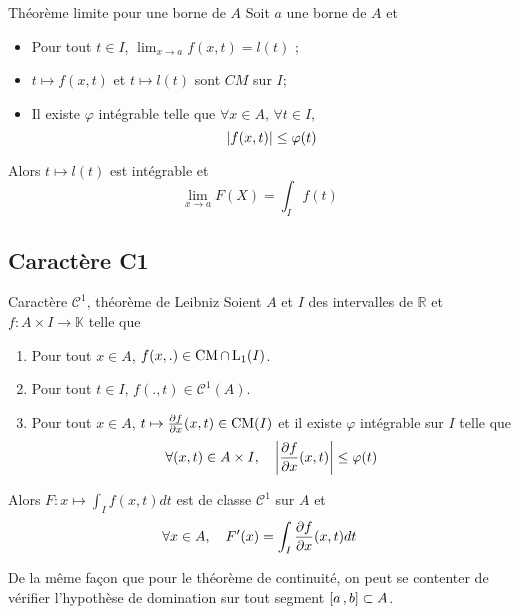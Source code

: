     \begin{prop}{Théorème limite pour une borne de $A$}{}
        Soit $a$ une borne de $A$ et 
        \begin{itemize}
            \item Pour tout $t \in I$, $\lim_{x \to a} f(x,t) = l(t)$ ;
            \item $t \mapsto f(x,t)$ et $t \mapsto l(t)$ sont $CM$ sur $I$;
            \item Il existe $\varphi$ intégrable telle que $\forall x \in A$, $\forall t \in I$, 
            \[ \left\lvert f(x,t)\right\rvert \leq \varphi(t) \]   
        \end{itemize}
        Alors $t \mapsto l(t)$ est intégrable et 
        \[ \lim_{x \to a} F(X) = \int_I f(t) \]   
    \end{prop}

    \subsection{Caractère C1}

    \begin{theo}{Caractère $\mathcal{C}^1$, théorème de Leibniz}{}
        Soient $A$ et $I$ des intervalles de $\mathbb{R}$ et $f : A \times I \to \mathbb{K}$ telle que 
        \begin{enumerate}[label=$(h_{\alph*})$]
            \item Pour tout $x \in A$, $f(x,.) \in \operatorname{CM} \cap \operatorname{L}_1(I)$.
            \item Pour tout $t \in I$, $f(.,t) \in \mathcal{C}^1(A)$.
            \item Pour tout $x \in A$, $t \mapsto \frac{\partial f}{\partial x}(x,t) \in \operatorname{CM}(I)$ et il existe $\varphi$ intégrable sur $I$ telle que 
            \[ \forall (x,t) \in A \times I, \quad \left\lvert \frac{\partial f}{\partial x}(x,t)\right\rvert \leq \varphi(t) \]   
        \end{enumerate}
        Alors $F : x \mapsto \int_{I} f(x,t)dt$ est de classe $\mathcal{C}^1$ sur $A$ et 
        \[ \forall x \in A, \quad F'(x) = \int_{I} \frac{\partial f}{\partial x}(x,t)dt \]   
    \end{theo}

    De la même façon que pour le théorème de continuité, on peut se contenter de vérifier l’hypothèse de domination sur tout segment $\left[ a \, , b \right] \subset A$. 


